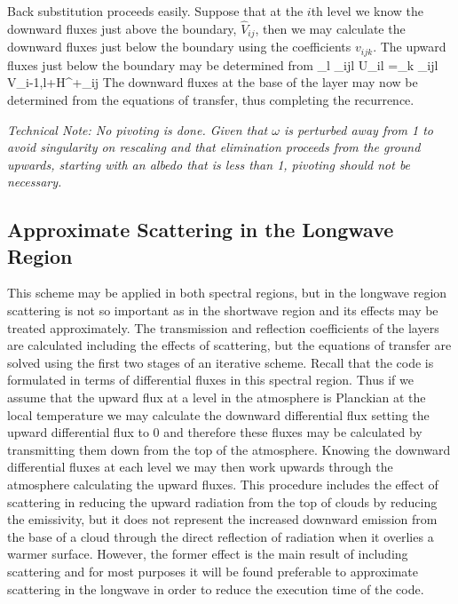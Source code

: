 \noindent
Back substitution proceeds easily. Suppose that at the  $i$th level we 
know the downward fluxes 
just above the boundary, $\hat{V}_{ij}$, then we may calculate the 
downward fluxes just below the boundary 
using the coefficients $v_{ijk}$. The upward fluxes just below the 
boundary may be determined from
\beq
\sum_{l} \beta_{ijl} U_{il} =\sum_{k} \gamma_{ijl} V_{i-1,l}+H^{+}_{ij}
\label{p2_eq53}
\eeq 
The downward fluxes at the base of the layer may now be determined from 
the equations of 
transfer, thus completing the recurrence.

{\it Technical Note: No pivoting is done. Given that $\omega$ is perturbed 
away from 1 to avoid singularity on rescaling and that elimination proceeds
from the ground upwards, starting with an albedo that is less than 1, 
pivoting should not be necessary.}

\subsection{Approximate Scattering in the Longwave Region}

This scheme may be applied in both spectral regions, but in the 
longwave region scattering is not 
so important as in the shortwave region and its effects may be treated 
approximately.
The transmission and reflection coefficients of the layers are 
calculated including the effects of 
scattering, but the equations of transfer are solved using the first 
two stages of an iterative 
scheme. Recall that the code is formulated in terms of differential 
fluxes in this spectral region. 
Thus if we assume that the upward flux at a level in the atmosphere is 
Planckian at the local 
temperature we may calculate the downward differential flux setting the 
upward differential flux 
to 0 and therefore these fluxes may be calculated by transmitting them 
down from the top of the 
atmosphere. Knowing the downward differential fluxes at each level we 
may then work upwards 
through the atmosphere calculating the upward fluxes. This procedure 
includes the effect of 
scattering in reducing the upward radiation from the top of clouds by 
reducing the emissivity, but 
it does not represent the increased downward emission from the base of 
a cloud through the direct 
reflection of radiation when it overlies a warmer surface. However, the 
former effect is the main 
result of including scattering and for most purposes it will be found 
preferable to approximate 
scattering in the longwave in order to reduce the execution time of the 
code.

